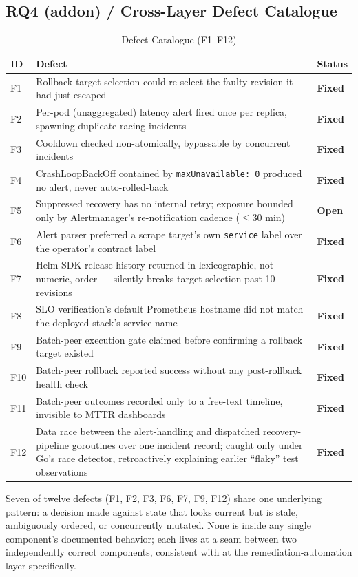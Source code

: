 \documentclass[conference]{IEEEtran}
\newcommand{\fixed}{\textcolor{green!45!black}{\textbf{Fixed}}}
\newcommand{\open}{\textcolor{orange!70!black}{\textbf{Open}}}
\begin{document}
\subsection{RQ4 (addon) / Cross-Layer Defect Catalogue}
\label{sec:defects}
\begin{table}[h]
\centering
\footnotesize
\caption{Defect Catalogue (F1--F12)}
\label{tab:defects}
\begin{tabular}{@{}p{0.5cm}p{5.6cm}p{1.0cm}@{}}
\toprule
\textbf{ID} & \textbf{Defect} & \textbf{Status} \\
\midrule
F1 & Rollback target selection could re-select the faulty revision it had just escaped & \fixed \\
F2 & Per-pod (unaggregated) latency alert fired once per replica, spawning duplicate racing incidents & \fixed \\
F3 & Cooldown checked non-atomically, bypassable by concurrent incidents & \fixed \\
F4 & CrashLoopBackOff contained by \texttt{maxUnavailable: 0} produced no alert, never auto-rolled-back & \fixed \\
F5 & Suppressed recovery has no internal retry; exposure bounded only by Alertmanager's re-notification cadence ($\leq$30 min) & \open \\
F6 & Alert parser preferred a scrape target's own \texttt{service} label over the operator's contract label & \fixed \\
F7 & Helm SDK release history returned in lexicographic, not numeric, order --- silently breaks target selection past 10 revisions & \fixed \\
F8 & SLO verification's default Prometheus hostname did not match the deployed stack's service name & \fixed \\
F9 & Batch-peer execution gate claimed before confirming a rollback target existed & \fixed \\
F10 & Batch-peer rollback reported success without any post-rollback health check & \fixed \\
F11 & Batch-peer outcomes recorded only to a free-text timeline, invisible to MTTR dashboards & \fixed \\
F12 & Data race between the alert-handling and dispatched recovery-pipeline goroutines over one incident record; caught only under Go's race detector, retroactively explaining earlier ``flaky'' test observations & \fixed \\
\bottomrule
\end{tabular}
\end{table}
Seven of twelve defects (F1, F2, F3, F6, F7, F9, F12) share one underlying pattern: a decision made against state that looks current but is stale, ambiguously ordered, or concurrently mutated. None is inside any single component's documented behavior; each lives at a seam between two independently correct components, consistent with \cite{gunawi2014bugs} at the remediation-automation layer specifically.
\end{document}
